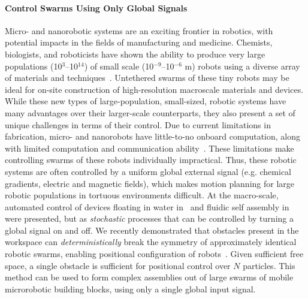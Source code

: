 \paragraph{Control Swarms Using Only Global Signals}
 Micro- and nanorobotic systems are an exciting frontier in robotics, with potential impacts in the fields of manufacturing and medicine. 
Chemists, biologists, and roboticists have shown the ability to produce very large populations (10$^3$--10$^{14}$) of small scale (10$^{-9}$--10$^{-6}$ m) robots using a diverse array of materials and techniques~\cite{rubenstein2012kilobot,ou2013motion,chiang2011toward}. 
Untethered swarms of these tiny robots may be ideal for on-site construction of high-resolution macroscale materials and devices. 
While these new types of large-population, small-sized, robotic systems have many advantages over their larger-scale counterparts, they also present a set of unique challenges in terms of their control. 
Due to  current limitations in fabrication, micro- and nanorobots have little-to-no onboard computation, along with limited computation and communication ability~\cite{chiang2011toward, chowdhury2015controlling, donald2013planning}.  
These limitations make controlling swarms of these robots individually impractical. 
Thus, these robotic systems are often controlled by a uniform global external signal (e.g. chemical gradients, electric and magnetic fields), which makes motion planning for large robotic populations in tortuous environments difficult.
At the macro-scale, automated control of devices floating in water in~\cite{mermoud2012real} and fluidic self assembly in~\cite{mastrangeli2014automated} were presented, but as \emph{stochastic} processes that can be controlled by turning a global signal on and off.
We recently demonstrated that obstacles present in the workspace can \emph{deterministically} break the symmetry of approximately identical robotic swarms, enabling positional configuration of robots~\cite{becker2013massive}. 
 Given sufficient free space, a single obstacle is sufficient for positional control over $N$ particles.  
This method can be used to form complex assemblies out of large swarms of mobile microrobotic building blocks, using only a single global input signal.

